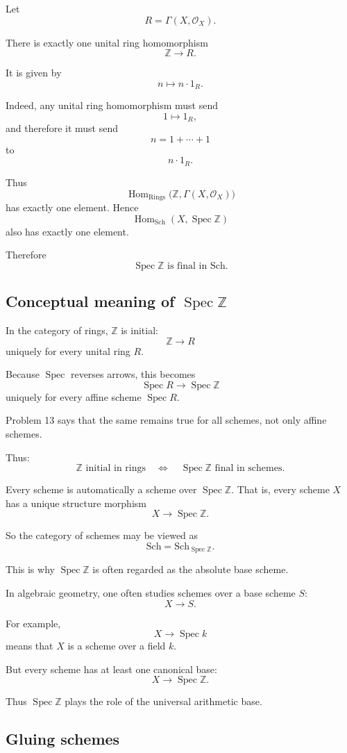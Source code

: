 \documentclass[12pt,a4paper]{article}
\DeclareMathOperator{\Hom}{Hom}
\newcommand{\ZZ}{\mathbb Z}
\newcommand{\OO}{\mathcal{O}}
\newcommand{\Spec}{\operatorname{Spec}}
\newcommand{\Sch}{\mathrm{Sch}}
\newcommand{\Rings}{\mathrm{Rings}}
\theoremstyle{notespace}
\begin{document}
Let
\[
R=\Gamma(X,\OO_X).
\]

There is exactly one unital ring homomorphism
\[
\ZZ\to R.
\]

It is given by
\[
n\longmapsto n\cdot 1_R.
\]

Indeed, any unital ring homomorphism must send
\[
1\longmapsto 1_R,
\]
and therefore it must send
\[
n=1+\cdots+1
\]
to
\[
n\cdot 1_R.
\]

Thus
\[
\Hom_{\Rings}\bigl(\ZZ,\Gamma(X,\OO_X)\bigr)
\]
has exactly one element. Hence
\[
\Hom_{\Sch}(X,\Spec\ZZ)
\]
also has exactly one element.

Therefore
\[
\boxed{
	\Spec\ZZ
	\text{ is final in }\Sch.
}
\]

\subsection{Conceptual meaning of \(\Spec\ZZ\)}

In the category of rings, \(\ZZ\) is initial:
\[
\ZZ\to R
\]
uniquely for every unital ring \(R\).

Because \(\Spec\) reverses arrows, this becomes
\[
\Spec R\to\Spec\ZZ
\]
uniquely for every affine scheme \(\Spec R\).

Problem 13 says that the same remains true for all schemes, not only affine schemes.

Thus:
\[
\boxed{
	\ZZ \text{ initial in rings}
	\quad\Longleftrightarrow\quad
	\Spec\ZZ \text{ final in schemes}.
}
\]

Every scheme is automatically a scheme over \(\Spec\ZZ\). That is, every scheme \(X\) has a unique structure morphism
\[
X\to\Spec\ZZ.
\]

So the category of schemes may be viewed as
\[
\Sch=\Sch_{\Spec\ZZ}.
\]

This is why \(\Spec\ZZ\) is often regarded as the absolute base scheme.

In algebraic geometry, one often studies schemes over a base scheme \(S\):
\[
X\to S.
\]

For example,
\[
X\to\Spec k
\]
means that \(X\) is a scheme over a field \(k\).

But every scheme has at least one canonical base:
\[
X\to\Spec\ZZ.
\]

Thus \(\Spec\ZZ\) plays the role of the universal arithmetic base.

\subsection{Gluing schemes}
\end{document}
